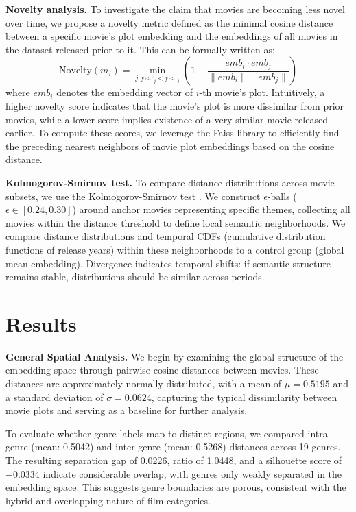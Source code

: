 \documentclass{article}
\begin{document}
\textbf{Novelty analysis.} To investigate the claim that movies are becoming less novel over time, we propose a novelty metric defined as the minimal cosine distance between a specific movie's plot embedding and the embeddings of all movies in the dataset released prior to it. This can be formally written as:
\begin{equation}
\label{novelty}
    \text{Novelty}(m_i) = \min_{j: \text{year}_j < \text{year}_i} \left( 1 - \frac{emb_i \cdot emb_j}{\|emb_i\| \|emb_j\|} \right)
\end{equation}
where \( emb_i \) denotes the embedding vector of $i$-th movie's plot.
Intuitively, a higher novelty score indicates that the movie's plot is more dissimilar from prior movies, while a lower score implies existence of a very similar movie released earlier.
To compute these scores, we leverage the Faiss library \cite{douze2024faiss} to efficiently find the preceding nearest neighbors of movie plot embeddings based on the cosine distance.

\textbf{Kolmogorov-Smirnov test.} To compare distance distributions across movie subsets, we use the Kolmogorov-Smirnov test \cite{massey1951}. We construct $\epsilon$-balls ($\epsilon \in [0.24, 0.30]$) around anchor movies representing specific themes, collecting all movies within the distance threshold to define local semantic neighborhoods. We compare distance distributions and temporal CDFs (cumulative distribution functions of release years) within these neighborhoods to a control group (global mean embedding). Divergence indicates temporal shifts: if semantic structure remains stable, distributions should be similar across periods.

\section{Results}\label{sec:results}

\textbf{General Spatial Analysis.} We begin by examining the global structure of the embedding space through pairwise cosine distances between movies. These distances are approximately normally distributed, with a mean of $\mu = 0.5195$ and a standard deviation of $\sigma = 0.0624$, capturing the typical dissimilarity between movie plots and serving as a baseline for further analysis.

To evaluate whether genre labels map to distinct regions, we compared intra-genre (mean: 0.5042) and inter-genre (mean: 0.5268) distances across 19 genres. The resulting separation gap of 0.0226, ratio of 1.0448, and a silhouette score of $-0.0334$ indicate considerable overlap, with genres only weakly separated in the embedding space. This suggests genre boundaries are porous, consistent with the hybrid and overlapping nature of film categories.
\end{document}
